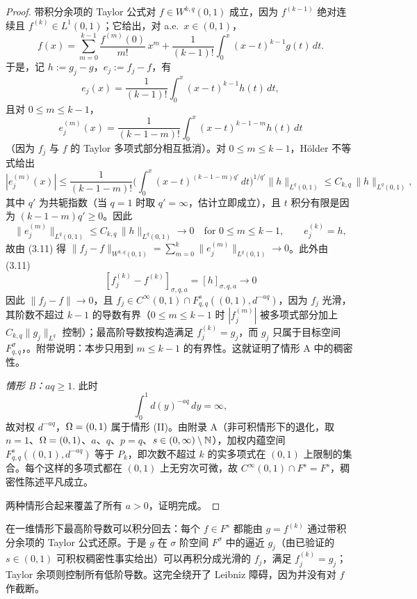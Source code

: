 \begin{proof}
带积分余项的 Taylor 公式对 $f\in W^{k,q}(0,1)$ 成立，因为 $f^{(k-1)}$ 绝对连续且 $f^{(k)}\in L^1(0,1)$；它给出，对 a.e.\ $x\in(0,1)$，
\begin{equation}
  f(x)=\sum_{m=0}^{k-1}\frac{f^{(m)}(0)}{m!}\,x^m
  +\frac{1}{(k-1)!}\int_0^x (x-t)^{k-1}g(t)\,dt .
  \tag{3.12}
\end{equation}
于是，记 $h:=g_j-g$，$e_j:=f_j-f$，有
\begin{equation}
  e_j(x)=\frac{1}{(k-1)!}\int_0^x (x-t)^{k-1}h(t)\,dt ,
  \tag{3.13}
\end{equation}
且对 $0\le m\le k-1$，
\begin{equation}
  e_j^{(m)}(x)=\frac{1}{(k-1-m)!}\int_0^x (x-t)^{k-1-m}h(t)\,dt
  \tag{3.14}
\end{equation}
（因为 $f_j$ 与 $f$ 的 Taylor 多项式部分相互抵消）。对 $0\le m\le k-1$，H\"older 不等式给出
\begin{equation}
  |e_j^{(m)}(x)|
  \le\frac{1}{(k-1-m)!}\Big(\int_0^x (x-t)^{(k-1-m)q'}\,dt\Big)^{1/q'}\|h\|_{L^q(0,1)}
  \le C_{k,q}\,\|h\|_{L^q(0,1)} ,
  \tag{3.15}
\end{equation}
其中 $q'$ 为共轭指数（当 $q=1$ 时取 $q'=\infty$，估计立即成立），且 $t$ 积分有限是因为 $(k-1-m)q'\ge0$。因此
\begin{equation}
  \|e_j^{(m)}\|_{L^q(0,1)}\le C_{k,q}\,\|h\|_{L^q(0,1)}\longrightarrow0
  \quad\text{for } 0\le m\le k-1,
  \qquad
  e_j^{(k)}=h ,
  \tag{3.16}
\end{equation}
故由 (3.11) 得 $\|f_j-f\|_{W^{k,q}(0,1)}=\sum_{m=0}^{k}\|e_j^{(m)}\|_{L^q(0,1)}\to0$。此外由 (3.11)
\[
  [f_j^{(k)}-f^{(k)}]_{\sigma,q,a}=[h]_{\sigma,q,a}\longrightarrow0
\]
因此 $\|f_j-f\|\to0$，且 $f_j\in C^\infty(0,1)\cap F^s_{q,q}((0,1),d^{-aq})$，因为 $f_j$ 光滑，其阶数不超过 $k-1$ 的导数有界（$0\le m\le k-1$ 时 $|f_j^{(m)}|$ 被多项式部分加上 $C_{k,q}\|g_j\|_{L^q}$ 控制）；最高阶导数按构造满足 $f_j^{(k)}=g_j$，而 $g_j$ 只属于目标空间 $F^\sigma_{q,q}$，。附带说明：本步只用到 $m\le k-1$ 的有界性。这就证明了情形 A 中的稠密性。

\emph{情形 B：$aq\ge1$}. 此时
\[
  \int_0^1 d(y)^{-aq}\,dy=\infty ,
\]
故对权 $d^{-aq}$，$\Omega=(0,1)$ 属于情形 (II)。由附录 A（非可积情形下的退化，取 $n=1$、$\Omega=(0,1)$、$a$、$q$、$p=q$、$s\in(0,\infty)\setminus\mathbb{N}$），加权内蕴空间 $F^s_{q,q}((0,1),d^{-aq})$ 等于 $P_k$，即次数不超过 $k$ 的实多项式在 $(0,1)$ 上限制的集合。每个这样的多项式都在 $(0,1)$ 上无穷次可微，故 $C^\infty(0,1)\cap F^s=F^s$，稠密性陈述平凡成立。

两种情形合起来覆盖了所有 $a>0$，证明完成。
\end{proof}

\begin{remark}[直觉]
在一维情形下最高阶导数可以积分回去：每个 $f\in F^s$ 都能由 $g=f^{(k)}$ 通过带积分余项的 Taylor 公式还原。于是 $g$ 在 $\sigma$ 阶空间 $F^\sigma$ 中的逼近 $g_j$（由已验证的 $s\in(0,1)$ 可积权稠密性事实给出）可以再积分成光滑的 $f_j$，满足 $f_j^{(k)}=g_j$；Taylor 余项则控制所有低阶导数。这完全绕开了 Leibniz 障碍，因为并没有对 $f$ 作截断。
\end{remark}
